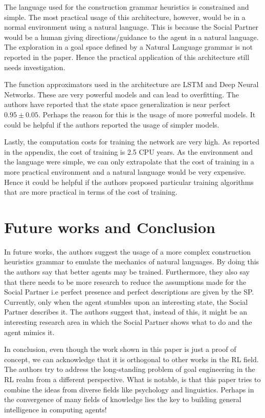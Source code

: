 The language used for the construction grammar heuristics is constrained and simple.  The most practical usage of this architecture,  however,  would be in a normal environment using a natural language.  This is because the Social Partner would be a human giving directions/guidance to the agent in a natural language.  The exploration in a goal space defined by a Natural Language grammar is not reported in the paper.  Hence the practical application of this architecture still needs investigation.

The function approximators used in the architecture are LSTM and Deep Neural Networks.  These are very powerful models and can lead to overfitting.  The authors have reported that the state space generalization is near perfect $0.95 \pm 0.05$.  Perhaps the reason for this is the usage of more powerful models.  It could be helpful if the authors reported the usage of simpler models.

Lastly,  the computation costs for training the network are very high.  As reported in the appendix,  the cost of training is 2.5 CPU years.  As the environment and the language were simple,  we can only extrapolate that the cost of training in a more practical environment and a natural language would be very expensive.  Hence it could be helpful if the authors proposed particular training algorithms that are more practical in terms of the cost of training.

\section{Future works and Conclusion}
In future works,  the authors suggest the usage of a more complex construction heuristics grammar to emulate the mechanics of natural languages.  By doing this the authors say that better agents may be trained.  Furthermore,  they also say that there needs to be more research to reduce the assumptions made for the Social Partner i.e perfect presence and perfect descriptions are given by the SP.  Currently, only when the agent stumbles upon an interesting state, the Social Partner describes it.  The authors suggest that,  instead of this,  it might be an interesting research area in which the Social Partner shows what to do and the agent mimics it.

In conclusion,  even though the work shown in this paper is just a proof of concept,  we can acknowledge that it is orthogonal to other works in the RL field.  The authors try to address the long-standing problem of goal engineering in the RL realm from a different perspective.  What is notable,  is that this paper tries to combine the ideas from diverse fields like psychology and linguistics.  Perhaps in the convergence of many fields of knowledge lies the key to building general intelligence in computing agents!

